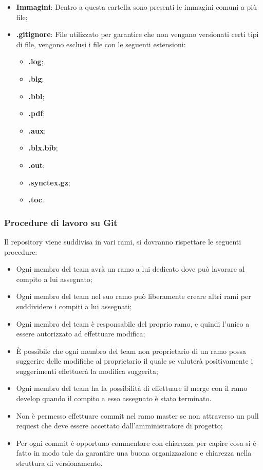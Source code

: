 \begin{itemize}
	\item \textbf{Immagini}: Dentro a questa cartella sono presenti le immagini comuni a più file;
	\item \textbf{.gitignore}: File utilizzato per garantire che non vengano versionati certi tipi di file, vengono esclusi i file con le seguenti estensioni:
	\begin{itemize} 
		\item \textbf{.log};
		\item \textbf{.blg};
		\item \textbf{.bbl};
		\item \textbf{.pdf};
		\item \textbf{.aux};
		\item \textbf{.blx.bib};
		\item \textbf{.out};
		\item \textbf{.synctex.gz};
		\item \textbf{.toc}.
	\end{itemize}
\end{itemize}
\subsubsection{Procedure di lavoro su Git}
Il repository viene suddivisa in vari rami, si dovranno rispettare le seguenti procedure:
\begin{itemize} 
\item Ogni membro del team avrà un ramo a lui dedicato dove può lavorare al compito a lui assegnato;
\item Ogni membro del team nel suo ramo può liberamente creare altri rami per suddividere i compiti a lui assegnati;
\item Ogni membro del team è responsabile del proprio ramo, e quindi l’unico a essere autorizzato ad effettuare modifica;
\item È possibile che ogni membro del team non proprietario di un ramo possa suggerire delle modifiche al proprietario il quale se valuterà positivamente i suggerimenti effettuerà la modifica suggerita;
\item Ogni membro del team ha la possibilità di effettuare il merge con il ramo develop quando il compito a esso assegnato è stato terminato.
\item Non è permesso effettuare commit nel ramo master se non attraverso un pull request che deve essere accettato dall’amministratore di progetto;
\item Per ogni commit è opportuno commentare con chiarezza per capire cosa si è fatto in modo tale da garantire una buona organizzazione e chiarezza nella struttura di versionamento.
\end{itemize}
